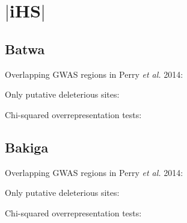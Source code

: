 \documentclass[12pt,landscape]{article}
\begin{document}
\section{$|$iHS$|$}
\subsection{Batwa}

Overlapping GWAS regions in Perry \emph{et al.} 2014:

Only putative deleterious sites:

Chi-squared overrepresentation tests:


\subsection{Bakiga}

Overlapping GWAS regions in Perry \emph{et al.} 2014:

Only putative deleterious sites:

Chi-squared overrepresentation tests:

\end{document}
